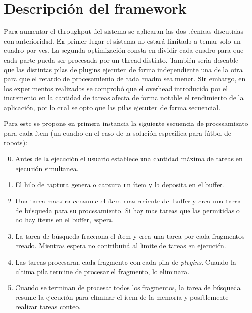
\section{Descripción del framework}

Para aumentar el throughput del sistema se aplicaran las dos técnicas discutidas
con anterioridad. En primer lugar el sistema no estará limitado a tomar solo un
cuadro por ves. La segunda optimización consta en dividir cada cuadro para que
cada parte pueda ser procesada por un thread distinto. También seria deseable
que las distintas pilas de plugins ejecuten de forma independiente una de la
otra para que el retardo de procesamiento de cada cuadro sea menor.  Sin
embargo, en los experimentos realizados se comprobó que el overhead introducido
por el incremento en la cantidad de tareas afecta de forma notable el
rendimiento de la aplicación, por lo cual se opto que las pilas ejecuten de
forma secuencial.

Para esto se propone en primera instancia la siguiente secuencia de procesamiento para cada ítem (un
cuadro en el caso de la solución especifica para fútbol de robots):

\begin{enumerate}

\setcounter{enumi}{-1}

\item	Antes de la ejecución el usuario establece una cantidad máxima de tareas
	en ejecución simultanea.

\item	El hilo de captura genera o captura un ítem y lo deposita en el buffer.

\item	Una tarea maestra consume el ítem mas reciente del buffer y crea una
	tarea de búsqueda para su procesamiento. Si hay mas tareas que las
	permitidas o no hay ítems en el buffer, espera.

\item	La tarea de búsqueda fracciona el ítem y crea una tarea por cada
	fragmentos creado. Mientras espera no contribuirá al limite de tareas en
	ejecución.

\item	Las tareas procesaran cada fragmento con cada pila de \emph{plugins}.
	Cuando la ultima pila termine de procesar el fragmento, lo eliminara.

\item	Cuando se terminan de procesar todos los fragmentos, la tarea de
	búsqueda resume la ejecución para eliminar el ítem de la memoria y
	posiblemente realizar tareas conteo.

\end{enumerate}

